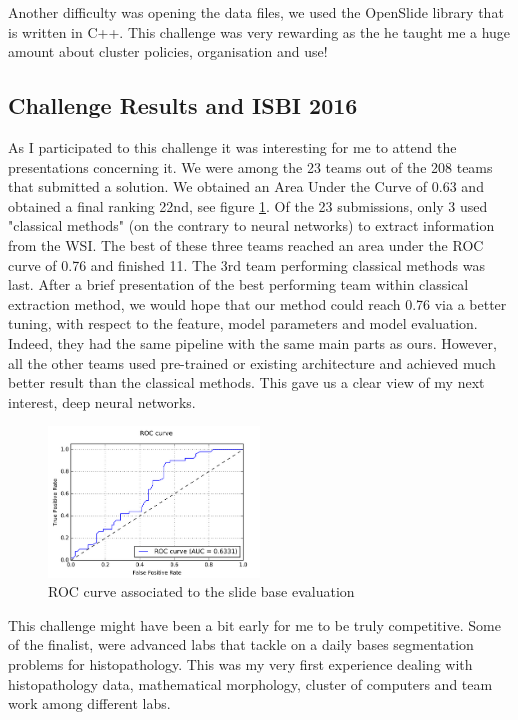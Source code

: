 \documentclass[a4paper,10pt]{article}
\begin{document}
Another difficulty was opening the data files, we used the OpenSlide library that is written in C++.
This challenge was very rewarding as the he taught me a huge amount about cluster policies, organisation and use!


\subsection{Challenge Results and ISBI 2016}

As I participated to this challenge it was interesting for me to
attend the presentations concerning it. We were among the 23 teams out
of the 208 teams that submitted a solution. We obtained an Area Under
the Curve of 0.63 and obtained a final ranking 22nd, see figure
\ref{Eval: ROC}. Of the 23 submissions, only 3 used "classical
methods" (on the contrary to neural networks) to extract information
from the WSI. The best of these three teams reached an area under the
ROC curve of 0.76 and finished 11. The 3rd team performing classical
methods was last. After a brief presentation of the best performing
team within classical extraction method, we would hope that our method
could reach 0.76 via a better tuning, with respect to the feature,
model parameters and model evaluation. Indeed, they had the same
pipeline with the same main parts as ours. However, all the other
teams used pre-trained or existing architecture and achieved much
better result than the classical methods. This gave us a clear view of
my next interest, deep neural networks. 

\begin{figure}[!ht]
\centering
\includegraphics[width=0.5\textwidth]{ROC.png}
\caption{ROC curve associated to the slide base evaluation}
\label{Eval: ROC}
\end{figure}

This challenge might have been a bit early for me to be truly
competitive. Some of the finalist, were advanced labs that tackle on a
daily bases segmentation problems for histopathology. This was my very first experience
dealing with histopathology data, mathematical morphology, cluster of
computers and team work among different labs.  
\end{document}

